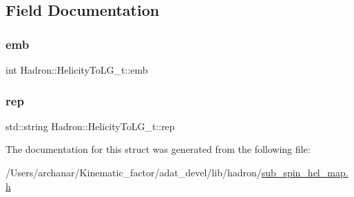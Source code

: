 \subsection{Field Documentation}
\mbox{\label{structHadron_1_1HelicityToLG__t_aa2343a2515755f6a1bc6cf802e12a183}} 
\subsubsection{\texorpdfstring{emb}{emb}}
{\footnotesize\ttfamily int Hadron\+::\+Helicity\+To\+L\+G\+\_\+t\+::emb}

\mbox{\label{structHadron_1_1HelicityToLG__t_a49a6869a62bf38d55a2cf332750bf365}} 
\subsubsection{\texorpdfstring{rep}{rep}}
{\footnotesize\ttfamily std\+::string Hadron\+::\+Helicity\+To\+L\+G\+\_\+t\+::rep}



The documentation for this struct was generated from the following file\+:\begin{DoxyCompactItemize}
\item 
/\+Users/archanar/\+Kinematic\+\_\+factor/adat\+\_\+devel/lib/hadron/\mbox{\hyperlink{lib_2hadron_2sub__spin__hel__map_8h}{sub\+\_\+spin\+\_\+hel\+\_\+map.\+h}}\end{DoxyCompactItemize}
